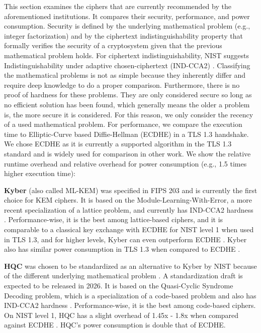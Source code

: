 \documentclass[public,noindent]{aisecreport}
\begin{document}
This section examines the ciphers that are currently recommended by the aforementioned institutions. It compares their security, performance, and power consumption. Security is defined by the underlying mathematical problem (e.g., integer factorization) and by the ciphertext indistinguishability property that formally verifies the security of a cryptosystem given that the previous mathematical problem holds. For ciphertext indistinguishability, NIST suggests Indistinguishability under adaptive chosen-ciphertext (IND-CCA2) \cite{alagic2022status}. Classifying the mathematical problems is not as simple because they inherently differ and require deep knowledge to do a proper comparison. Furthermore, there is no proof of hardness for these problems. They are only considered secure so long as no efficient solution has been found, which generally means the older a problem is, the more secure it is considered. For this reason, we only consider the recency of a used mathematical problem. 
For performance, we compare the execution time to Elliptic-Curve based Diffie-Hellman (ECDHE) in a TLS 1.3 handshake. We chose ECDHE as it is currently a supported algorithm in the TLS 1.3 standard and is widely used for comparison in other work. We show the relative runtime overhead and relative overhead for power consumption (e.g., 1.5 times higher execution time):

\textbf{Kyber} (also called ML-KEM) was specified in FIPS 203 \cite{unknown-author-2024-3} and is currently the first choice for KEM ciphers. It is based on the Module-Learning-With-Error, a more recent specialization of a lattice problem, and currently has IND-CCA2 hardness \cite{avanzi2019crystals}. Performance-wise, it is the best among lattice-based ciphers, and it is comparable to a classical key exchange with ECDHE for NIST level 1 when used in TLS 1.3, and for higher levels, Kyber can even outperform ECDHE \cite{doring2022post}. Kyber also has similar power consumption in TLS 1.3 when compared to ECDHE \cite{tasopoulos2023energy}.

\textbf{HQC} was chosen to be standardized as an alternative to Kyber by NIST because of the different underlying mathematical problem \cite{Boutin_2025}. A standardization draft is expected to be released in 2026. It is based on the Quasi-Cyclic Syndrome Decoding problem, which is a specialization of a code-based problem and also has IND-CCA2 hardness \cite{gaborit2025hamming}. Performance-wise, it is the best among code-based ciphers. On NIST level 1, HQC has a slight overhead of 1.45x - 1.8x when compared against ECDHE \cite{sikeridis2020assessing, alnahawi2024comprehensive}. HQC's power consumption is double that of ECDHE\cite{tasopoulos2023energy}.
\end{document}
